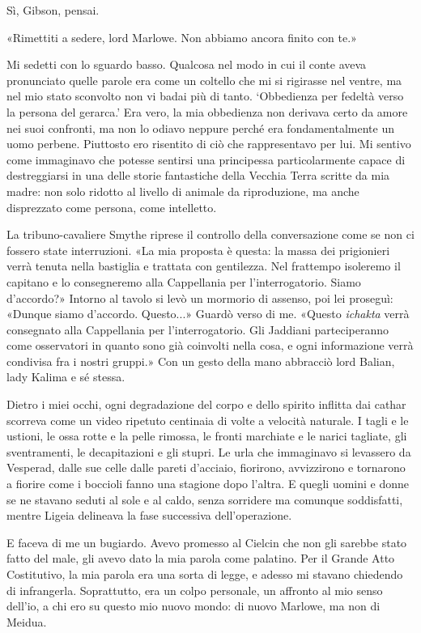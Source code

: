 Sì, Gibson, pensai.

«Rimettiti a sedere, lord Marlowe. Non abbiamo ancora finito con te.»

Mi sedetti con lo sguardo basso. Qualcosa nel modo in cui il conte aveva
pronunciato quelle parole era come un coltello che mi si rigirasse nel
ventre, ma nel mio stato sconvolto non vi badai più di tanto.
`Obbedienza per fedeltà verso la persona del gerarca.' Era vero, la mia
obbedienza non derivava certo da amore nei suoi confronti, ma non lo
odiavo neppure perché era fondamentalmente un uomo perbene. Piuttosto
ero risentito di ciò che rappresentavo per lui. Mi sentivo come
immaginavo che potesse sentirsi una principessa particolarmente capace
di destreggiarsi in una delle storie fantastiche della Vecchia Terra
scritte da mia madre: non solo ridotto al livello di animale da
riproduzione, ma anche disprezzato come persona, come intelletto.

La tribuno-cavaliere Smythe riprese il controllo della conversazione
come se non ci fossero state interruzioni. «La mia proposta è questa: la
massa dei prigionieri verrà tenuta nella bastiglia e trattata con
gentilezza. Nel frattempo isoleremo il capitano e lo consegneremo alla
Cappellania per l'interrogatorio. Siamo d'accordo?» Intorno al tavolo si
levò un mormorio di assenso, poi lei proseguì: «Dunque siamo d'accordo.
Questo...» Guardò verso di me. «Questo \emph{ichakta} verrà consegnato
alla Cappellania per l'interrogatorio. Gli Jaddiani \emph{}
parteciperanno come osservatori in quanto sono già coinvolti nella cosa,
e ogni informazione verrà condivisa fra i nostri gruppi.» Con un gesto
della mano abbracciò lord Balian, lady Kalima e sé stessa.

Dietro i miei occhi, ogni degradazione del corpo e dello spirito
inflitta dai cathar scorreva come un video ripetuto centinaia di volte a
velocità naturale. I tagli e le ustioni, le ossa rotte e la pelle
rimossa, le fronti marchiate e le narici tagliate, gli sventramenti, le
decapitazioni e gli stupri. Le urla che immaginavo si levassero da
Vesperad, dalle sue celle dalle pareti d'acciaio, fiorirono, avvizzirono
e tornarono a fiorire come i boccioli fanno una stagione dopo l'altra. E
quegli uomini e donne se ne stavano seduti al sole e al caldo, senza
sorridere ma comunque soddisfatti, mentre Ligeia delineava la fase
successiva dell'operazione.

E faceva di me un bugiardo. Avevo promesso al Cielcin che non gli
sarebbe stato fatto del male, gli avevo dato la mia parola come
palatino. Per il Grande Atto Costitutivo, la mia parola era una sorta di
legge, e adesso mi stavano chiedendo di infrangerla. Soprattutto, era un
colpo personale, un affronto al mio senso dell'io, a chi ero su questo
mio nuovo mondo: di nuovo Marlowe, ma non di Meidua.

